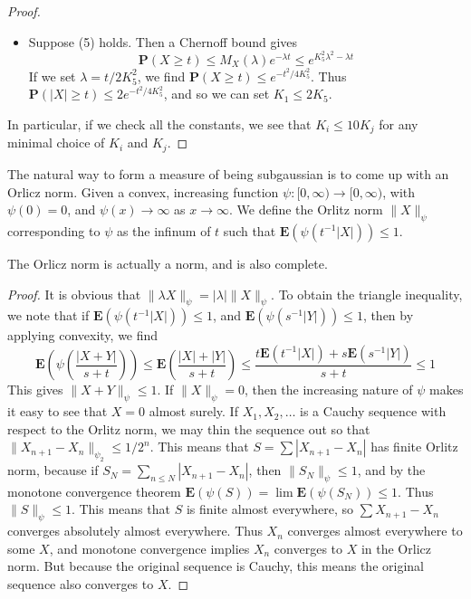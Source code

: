 \begin{proof}
\begin{itemize}
    \item Suppose (5) holds. Then a Chernoff bound gives
    \[ \mathbf{P}(X \geq t) \leq M_X(\lambda) e^{-\lambda t} \leq e^{K_5^2 \lambda^2 - \lambda t} \]
    If we set $\lambda = t/2K_5^2$, we find $\mathbf{P}(X \geq t) \leq e^{-t^2/4K_5^2}$. Thus $\mathbf{P}(|X| \geq t) \leq 2 e^{-t^2/4K_5^2}$, and so we can set $K_1 \leq 2K_5$.
\end{itemize}
%
In particular, if we check all the constants, we see that $K_i \leq 10K_j$ for any minimal choice of $K_i$ and $K_j$.
\end{proof}

The natural way to form a measure of being subgaussian is to come up with an Orlicz norm. Given a convex, increasing function $\psi:[0,\infty) \to [0,\infty)$, with $\psi(0) = 0$, and $\psi(x) \to \infty$ as $x \to \infty$. We define the Orlitz norm $\| X \|_\psi$ corresponding to $\psi$ as the infinum of $t$ such that $\mathbf{E}(\psi(t^{-1} |X|)) \leq 1$.

\begin{theorem}
    The Orlicz norm is actually a norm, and is also complete.
\end{theorem}
\begin{proof}
    It is obvious that $\| \lambda X \|_\psi = |\lambda| \| X \|_\psi$. To obtain the triangle inequality, we note that if $\mathbf{E}(\psi(t^{-1} |X|)) \leq 1$, and $\mathbf{E}(\psi(s^{-1} |Y|)) \leq 1$, then by applying convexity, we find
    \[ \mathbf{E} \left(\psi \left(\frac{|X + Y|}{s + t} \right) \right) \leq \mathbf{E} \left( \frac{|X| + |Y|}{s + t} \right) \leq \frac{t \mathbf{E}(t^{-1} |X|) + s \mathbf{E}(s^{-1} |Y|)}{s + t} \leq 1 \]
    This gives $\| X + Y \|_\psi \leq 1$. If $\| X \|_\psi = 0$, then the increasing nature of $\psi$ makes it easy to see that $X = 0$ almost surely. If $X_1, X_2, \dots$ is a Cauchy sequence with respect to the Orlitz norm, we may thin the sequence out so that $\| X_{n+1} - X_n \|_{\psi_2} \leq 1/2^n$. This means that $S = \sum |X_{n+1} - X_n|$ has finite Orlitz norm, because if $S_N = \sum_{n \leq N} |X_{n+1} - X_n|$, then $\| S_N \|_\psi \leq 1$, and by the monotone convergence theorem $\mathbf{E}(\psi(S)) = \lim \mathbf{E}(\psi(S_N)) \leq 1$. Thus $\| S \|_\psi \leq 1$. This means that $S$ is finite almost everywhere, so $\sum X_{n+1} - X_n$ converges absolutely almost everywhere. Thus $X_n$ converges almost everywhere to some $X$, and monotone convergence implies $X_n$ converges to $X$ in the Orlicz norm. But because the original sequence is Cauchy, this means the original sequence also converges to $X$.
\end{proof}


